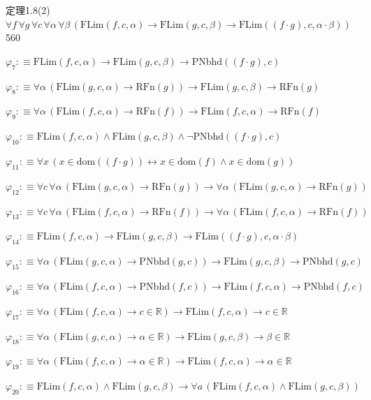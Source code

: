 \begin{fullproof}{定理1.8(2)}{$\forall f\,\forall g\,\forall c\,\forall \alpha\,\forall \beta\,(\mathrm{FLim}(f,c,\alpha) \to \mathrm{FLim}(g,c,\beta) \to \mathrm{FLim}((f \cdot g),c,\alpha \cdot \beta))$}{560}
\begin{abbrevlist}
\item $\varphi_{7} :\equiv \mathrm{FLim}(f,c,\alpha) \to \mathrm{FLim}(g,c,\beta) \to \mathrm{PNbhd}((f \cdot g),c)$
\item $\varphi_{8} :\equiv \forall \alpha\,(\mathrm{FLim}(g,c,\alpha) \to \mathrm{RFn}(g)) \to \mathrm{FLim}(g,c,\beta) \to \mathrm{RFn}(g)$
\item $\varphi_{9} :\equiv \forall \alpha\,(\mathrm{FLim}(f,c,\alpha) \to \mathrm{RFn}(f)) \to \mathrm{FLim}(f,c,\alpha) \to \mathrm{RFn}(f)$
\item $\varphi_{10} :\equiv \mathrm{FLim}(f,c,\alpha) \land \mathrm{FLim}(g,c,\beta) \land \neg \mathrm{PNbhd}((f \cdot g),c)$
\item $\varphi_{11} :\equiv \forall x\,(x \in \mathrm{dom}((f \cdot g)) \leftrightarrow x \in \mathrm{dom}(f) \land x \in \mathrm{dom}(g))$
\item $\varphi_{12} :\equiv \forall c\,\forall \alpha\,(\mathrm{FLim}(g,c,\alpha) \to \mathrm{RFn}(g)) \to \forall \alpha\,(\mathrm{FLim}(g,c,\alpha) \to \mathrm{RFn}(g))$
\item $\varphi_{13} :\equiv \forall c\,\forall \alpha\,(\mathrm{FLim}(f,c,\alpha) \to \mathrm{RFn}(f)) \to \forall \alpha\,(\mathrm{FLim}(f,c,\alpha) \to \mathrm{RFn}(f))$
\item $\varphi_{14} :\equiv \mathrm{FLim}(f,c,\alpha) \to \mathrm{FLim}(g,c,\beta) \to \mathrm{FLim}((f \cdot g),c,\alpha \cdot \beta)$
\item $\varphi_{15} :\equiv \forall \alpha\,(\mathrm{FLim}(g,c,\alpha) \to \mathrm{PNbhd}(g,c)) \to \mathrm{FLim}(g,c,\beta) \to \mathrm{PNbhd}(g,c)$
\item $\varphi_{16} :\equiv \forall \alpha\,(\mathrm{FLim}(f,c,\alpha) \to \mathrm{PNbhd}(f,c)) \to \mathrm{FLim}(f,c,\alpha) \to \mathrm{PNbhd}(f,c)$
\item $\varphi_{17} :\equiv \forall \alpha\,(\mathrm{FLim}(f,c,\alpha) \to c \in \mathbb{R}) \to \mathrm{FLim}(f,c,\alpha) \to c \in \mathbb{R}$
\item $\varphi_{18} :\equiv \forall \alpha\,(\mathrm{FLim}(g,c,\alpha) \to \alpha \in \mathbb{R}) \to \mathrm{FLim}(g,c,\beta) \to \beta \in \mathbb{R}$
\item $\varphi_{19} :\equiv \forall \alpha\,(\mathrm{FLim}(f,c,\alpha) \to \alpha \in \mathbb{R}) \to \mathrm{FLim}(f,c,\alpha) \to \alpha \in \mathbb{R}$
\item $\varphi_{20} :\equiv \mathrm{FLim}(f,c,\alpha) \land \mathrm{FLim}(g,c,\beta) \to \forall a\,(\mathrm{FLim}(f,c,\alpha) \land \mathrm{FLim}(g,c,\beta))$

\end{abbrevlist}
\end{fullproof}
